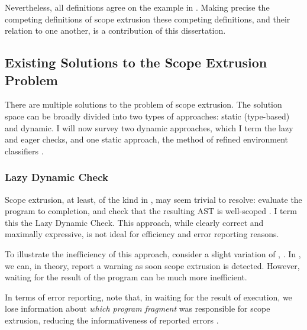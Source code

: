 Nevertheless, all definitions agree on the example in . Making precise the competing definitions of scope extrusion these competing definitions, and their relation to one another, is a contribution of this dissertation. 

\subsection{Existing Solutions to the Scope Extrusion Problem}
There are multiple solutions to the problem of scope extrusion. The solution space can be broadly divided into two types of approaches: static (type-based) and dynamic. I will now survey two dynamic approaches, which I term the lazy and eager checks, and one static approach, the method of refined environment classifiers \citep{kiselyov-16,isoda-24}. 

\subsubsection{Lazy Dynamic Check}\label{subsubsection:lazy-dynamic-check}
Scope extrusion, at least, of the kind in , may seem trivial to resolve: evaluate the program to completion, and check that the resulting AST is well-scoped \citep{kiselyov-14}. I term this the Lazy Dynamic Check. This approach, while clearly correct and maximally expressive, is not ideal for efficiency and error reporting reasons. 

To illustrate the inefficiency of this approach, consider a slight variation of , . In , we can, in theory, report a warning as soon scope extrusion is detected. However, waiting for the result of the program can be much more inefficient. 

In terms of error reporting, note that, in waiting for the result of execution, we lose information about \textit{which program fragment} was responsible for scope extrusion, reducing the informativeness of reported errors \citep{kiselyov-14}.  

